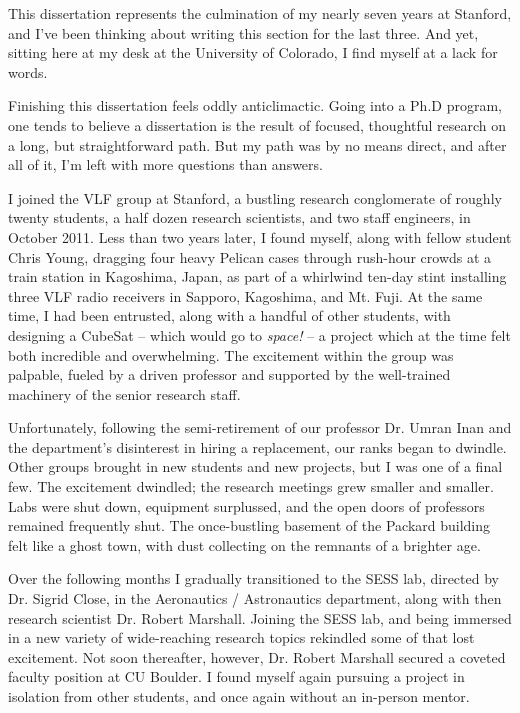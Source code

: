 This dissertation represents the culmination of my nearly seven years at Stanford, and I've been thinking about writing this section for the last three. And yet, sitting here at my desk at the University of Colorado, I find myself at a lack for words.

Finishing this dissertation feels oddly anticlimactic. Going into a Ph.D program, one tends to believe a dissertation is the result of focused, thoughtful research on a long, but straightforward path. But my path was by no means direct, and after all of it, I'm left with more questions than answers.

I joined the VLF group at Stanford, a bustling research conglomerate of roughly twenty students, a half dozen research scientists, and two staff engineers, in October 2011. Less than two years later, I found myself, along with fellow student Chris Young, dragging four heavy Pelican cases through rush-hour crowds at a train station in Kagoshima, Japan, as part of a whirlwind ten-day stint installing three VLF radio receivers in Sapporo, Kagoshima, and Mt. Fuji. At the same time, I had been entrusted, along with a handful of other students, with designing a CubeSat -- which would go to \emph{space!} -- a project which at the time felt both incredible and overwhelming. The excitement within the group was palpable, fueled by a driven professor and supported by the well-trained machinery of the senior research staff.

Unfortunately, following the semi-retirement of our professor Dr. Umran Inan and the department's disinterest in hiring a replacement, our ranks began to dwindle. Other groups brought in new students and new projects, but I was one of a final few. The excitement dwindled; the research meetings grew smaller and smaller. Labs were shut down, equipment surplussed, and the open doors of professors remained frequently shut. The once-bustling basement of the Packard building felt like a ghost town, with dust collecting on the remnants of a brighter age.

Over the following months I gradually transitioned to the SESS lab, directed by Dr. Sigrid Close, in the Aeronautics / Astronautics department, along with then research scientist Dr. Robert Marshall. Joining the SESS lab, and being immersed in a new variety of wide-reaching research topics rekindled some of that lost excitement. Not soon thereafter, however, Dr. Robert Marshall secured a coveted faculty position at CU Boulder. I found myself again pursuing a project in isolation from other students, and once again without an in-person mentor.

